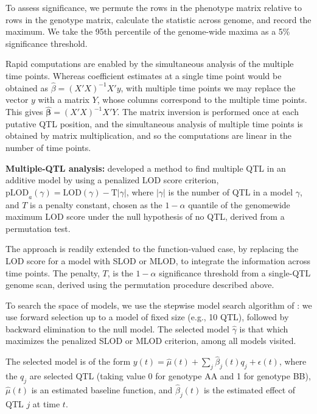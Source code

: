 \documentclass[12pt,letterpaper]{article}
\begin{document}
To assess significance, we permute the rows in the phenotype matrix
relative to rows in the genotype
matrix, calculate the statistic across genome, and record the
maximum. We take the 95th percentile of the genome-wide maxima as a
5\% significance threshold.

Rapid computations are enabled by the simultaneous analysis of the multiple time
points. Whereas coefficient estimates at a single time point would be
obtained as $\hat{\beta} = (X'X)^{-1} X' y$, with multiple time points
we may replace the vector $y$ with a matrix $Y$, whose columns
correspond to the multiple time points. This gives
$\hat{\boldsymbol{\beta}} = (X'X)^{-1} X' Y$. The matrix inversion is
performed once at each putative QTL position, and the simultaneous
analysis of multiple time points is obtained by matrix
multiplication, and so the computations are linear in the number of
time points.


\textbf{Multiple-QTL analysis:}
\citet{Broman2002} developed a method to find multiple QTL in
an additive model by using a penalized LOD score criterion,
$\text{pLOD}_a(\gamma) = \text{LOD}(\gamma) - \text{T}|\gamma|$,
where $|\gamma|$ is the number of QTL in a model $\gamma$, and $T$ is a
penalty constant, chosen as the $1 - \alpha$ quantile of the
genomewide maximum LOD score under the null hypothesis of no QTL,
derived from a permutation test.

The approach is readily extended to the function-valued case, by
replacing the LOD score for a model with SLOD or
MLOD, to integrate the information across time points. The penalty,
$T$, is the $1-\alpha$ significance threshold from a
single-QTL genome scan, derived using the permutation procedure
described above.

To search the space of models, we use the stepwise model search
algorithm of \citet{Broman2002}: we use forward selection up to a
model of fixed size (e.g., 10 QTL), followed by backward elimination
to the null model. The selected model $\hat{\gamma}$ is that which maximizes the
penalized SLOD or MLOD criterion, among all models visited.

The selected model is of the form
$y(t) = \hat{\mu}(t) + \sum_j \hat{\beta}_j(t) q_j + \epsilon(t)$,
where the $q_j$ are selected QTL (taking value 0 for genotype AA and 1
for genotype BB), $\hat{\mu}(t)$
is an estimated baseline
function, and $\hat{\beta}_j(t)$ is the estimated effect of QTL $j$ at
time $t$.



\clearpage
\end{document}
